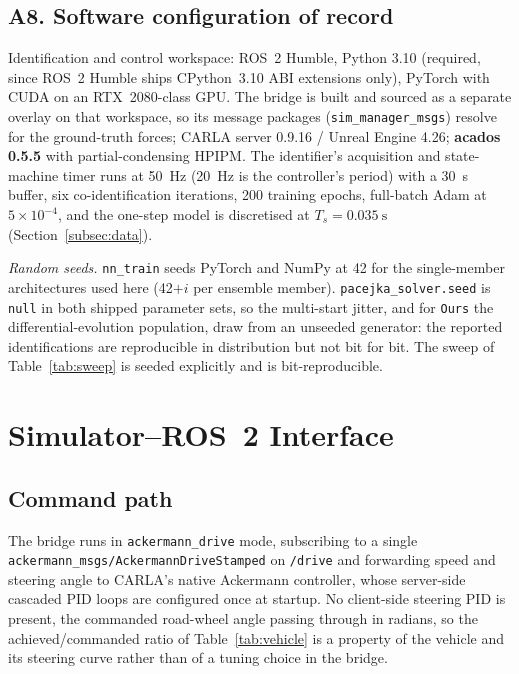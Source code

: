 \subsection*{A8. Software configuration of record}
Identification and control workspace: ROS~2 Humble, Python 3.10 (required,
since ROS~2 Humble ships CPython~3.10 ABI extensions only), PyTorch with CUDA
on an RTX~2080-class GPU. The bridge is built and sourced as a separate overlay
on that workspace, so its message packages
(\texttt{sim\_manager\_\allowbreak msgs}) resolve for the ground-truth forces;
CARLA server 0.9.16 / Unreal Engine 4.26; \textbf{acados 0.5.5} with
partial-condensing HPIPM. The identifier's acquisition and state-machine timer
runs at \SI{50}{\hertz} (\SI{20}{\hertz} is the controller's period) with a
\SI{30}{\second} buffer, six co-identification iterations, 200 training
epochs, full-batch Adam at $5\times10^{-4}$, and the one-step model is
discretised at $T_{s}=\SI{0.035}{\second}$ (Section~\ref{subsec:data}).

\emph{Random seeds.} \texttt{nn\_train} seeds PyTorch and NumPy at \num{42} for
the single-member architectures used here (\num{42}$+i$ per ensemble member).
\texttt{pacejka\_solver.seed} is \texttt{null} in both shipped parameter sets,
so the multi-start jitter, and for \texttt{Ours} the differential-evolution
population, draw from an unseeded generator: the reported identifications are
reproducible in distribution but not bit for bit. The sweep of
Table~\ref{tab:sweep} is seeded explicitly and is bit-reproducible.

\section{Simulator--ROS~2 Interface}
\label{sec:iface}

\subsection*{Command path}
The bridge runs in \texttt{ackermann\_drive} mode, subscribing to a single
\texttt{ack\-er\-mann\_msgs/AckermannDriveStamped} on \texttt{/drive} and
forwarding speed and steering angle to CARLA's native Ackermann controller,
whose server-side cascaded PID loops are configured once at startup. No
client-side steering PID is present, the commanded road-wheel angle passing
through in radians, so the achieved/\allowbreak commanded ratio of
Table~\ref{tab:vehicle} is a property of the vehicle and its steering curve
rather than of a tuning choice in the bridge.

